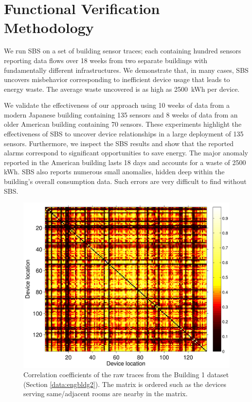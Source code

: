 \section{Functional Verification Methodology}
\label{sec:sbsmethod}
We run SBS on a set of building sensor traces; each containing hundred sensors reporting data flows over 18 weeks from two separate buildings with fundamentally different infrastructures.  
We demonstrate that, in many cases, SBS uncovers misbehavior corresponding to inefficient device usage that leads to energy waste.  
The average waste uncovered is as high as 2500~kWh per device. 

We validate the effectiveness of our approach using 10 weeks of data from a modern Japanese building containing 135 sensors and 
8 weeks of data from an older American building containing 70 sensors.
These experiments highlight the effectiveness of SBS to uncover device relationships in a large deployment of 135 sensors.
Furthermore, we inspect the SBS results and show that the reported alarms correspond to significant opportunities to save energy.
The major anomaly reported in the American building lasts 18 days and accounts for a waste of 2500 kWh. %
SBS also reports numerous small anomalies, hidden deep within the building's overall consumption data.  Such errors are very difficult to find
without SBS.

\begin{figure}
\begin{center}
\includegraphics[width=.5\textwidth]{figs/heatMap_raw_201106-eps-converted-to.pdf}
\caption{Correlation coefficients of the raw traces from the Building 1 dataset (Section \ref{data:engbldg2}).
The matrix is ordered such as the devices serving same/adjacent rooms are nearby in the matrix.}
\label{fig:heatmap:raw}
\end{center}
\end{figure}

